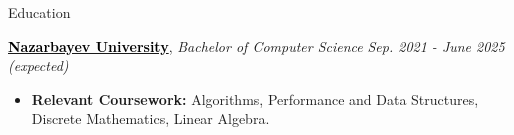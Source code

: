 \documentclass{resume} %
\begin{document}

\begin{rSection}{Education}

\href{https://nu.edu.kz/}{\textcolor{black}{{\bf \textbf{Nazarbayev University}}}}, \textit {Bachelor of Computer Science} \href{https://nu.edu.kz/}{\textcolor{black}{{\small \faExternalLink}}} \hfill \textit {Sep. 2021 - June 2025 (expected)}
\begin{itemize}
     \item \textbf{Relevant Coursework:} Algorithms, Performance and Data Structures, Discrete Mathematics, Linear Algebra.
 \end{itemize}


\end{rSection}

 

 
\end{document}
